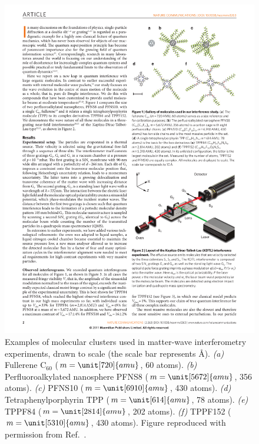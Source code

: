 \documentclass[3p,sort&compress,12pt]{elsarticle}
\begin{document}
\begin{figure}
\centering
\includegraphics[scale=1]{clusters.pdf}
\caption{Examples of molecular clusters used in matter-wave interferometry experiments, drawn to scale (the scale bar represents \unit[10]{\AA}). \emph{(a)} Fullerene C$_{60}$ ($m = \unit[720]{amu}$, 60 atoms). \emph{(b)} Perfluoroalkylated nanosphere PFNS8 ($m = \unit[5672]{amu}$, 356 atoms). \emph{(c)} PFNS10 ($m = \unit[6910]{amu}$, 430 atoms). \emph{(d)} Tetraphenylporphyrin TPP ($m = \unit[614]{amu}$, 78 atoms). \emph{(e)} TPPF84 ($m = \unit[2814]{amu}$, 202 atoms). \emph{(f)} TPPF152 ($m = \unit[5310]{amu}$, 430 atoms). Figure reproduced with permission from Ref.~\cite{Gerlich:2011:aa}. }
\label{fig:molecules}
\end{figure}
\end{document}
